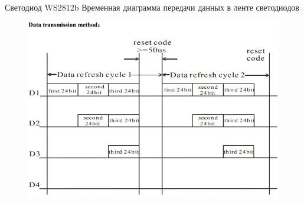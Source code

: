 \begin{frame}{Светодиод WS2812b}
  Временная диаграмма передачи данных в ленте светодиодов
  \begin{figure}[H]
    \centering
    \includegraphics[height=0.75\textheight]{assets/images/Временная диаграма передачи данных.png}
    \label{img:WS2812__data_transmission}
  \end{figure}
\end{frame}